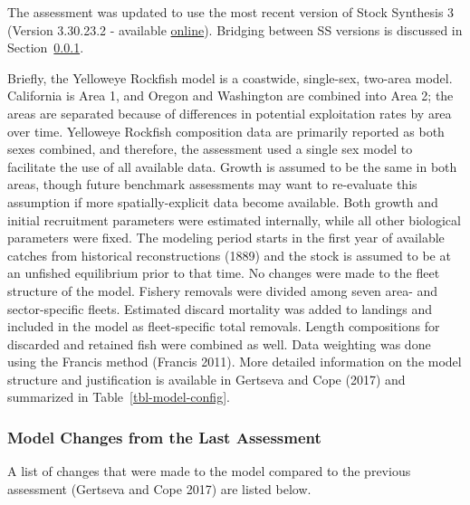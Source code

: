 \documentclass[
]{scrartcl}
\begin{document}
The assessment was updated to use the most recent version of Stock
Synthesis 3 (Version 3.30.23.2 - available
\href{https://github.com/nmfs-ost/ss3-source-code/releases/tag/v3.30.23.2}{online}).
Bridging between SS versions is discussed in Section~\ref{sec-changes}.

Briefly, the Yelloweye Rockfish model is a coastwide, single-sex,
two-area model. California is Area 1, and Oregon and Washington are
combined into Area 2; the areas are separated because of differences in
potential exploitation rates by area over time. Yelloweye Rockfish
composition data are primarily reported as both sexes combined, and
therefore, the assessment used a single sex model to facilitate the use
of all available data. Growth is assumed to be the same in both areas,
though future benchmark assessments may want to re-evaluate this
assumption if more spatially-explicit data become available. Both growth
and initial recruitment parameters were estimated internally, while all
other biological parameters were fixed. The modeling period starts in
the first year of available catches from historical reconstructions
(1889) and the stock is assumed to be at an unfished equilibrium prior
to that time. No changes were made to the fleet structure of the model.
Fishery removals were divided among seven area- and sector-specific
fleets. Estimated discard mortality was added to landings and included
in the model as fleet-specific total removals. Length compositions for
discarded and retained fish were combined as well. Data weighting was
done using the Francis method (Francis 2011). More detailed information
on the model structure and justification is available in Gertseva and
Cope (2017) and summarized in Table~\ref{tbl-model-config}.

\subsubsection{Model Changes from the Last
Assessment}\label{sec-changes}

A list of changes that were made to the model compared to the previous
assessment (Gertseva and Cope 2017) are listed below.
\end{document}
